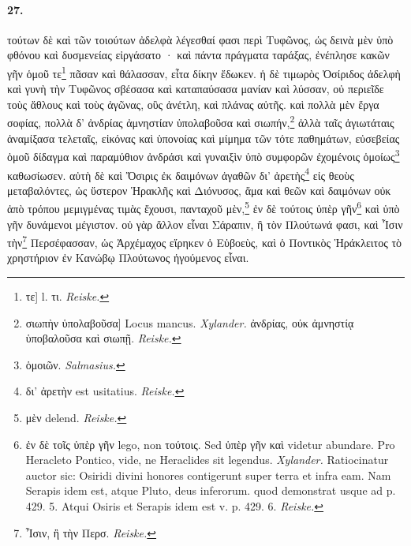 \documentclass[a4paper, 11pt, oneside, polutonikogreek, german]{article}
\begin{document}
\paragraph{27.}
τούτων δὲ καὶ τῶν τοιούτων ἀδελφὰ λέγεσθαί φασι περὶ Τυφῶνος, ὡς δεινὰ μὲν ὑπὸ φθόνου καὶ δυσμενείας εἰργάσατο · καὶ πάντα πράγματα ταράξας, ἐνέπλησε κακῶν γῆν ὁμοῦ τε\footnote{τε] l. τι. \emph{Reiske.}} πᾶσαν καὶ θάλασσαν, εἶτα δίκην ἔδωκεν. ἡ δὲ τιμωρὸς Ὀσίριδος ἀδελφὴ καὶ γυνὴ τὴν Τυφῶνος σβέσασα καὶ καταπαύσασα μανίαν καὶ λύσσαν, οὐ περιεῖδε τοὺς ἄθλους καὶ τοὺς ἀγῶνας, οὓς ἀνέτλη, καὶ πλάνας αὑτῆς. καὶ πολλὰ μὲν ἔργα σοφίας, πολλὰ δ' ἀνδρίας ἀμνηστίαν ὑπολαβοῦσα καὶ σιωπήν,\footnote{σιωπὴν ὑπολαβοῦσα] Locus mancus. \emph{Xylander.} ἀνδρίας, οὐκ ἀμνηστίᾳ ὑποβαλοῦσα καὶ σιωπῇ. \emph{Reiske.}} ἀλλὰ ταῖς ἁγιωτάταις ἀναμίξασα τελεταῖς, εἰκόνας καὶ ὑπονοίας καὶ μίμημα τῶν τότε παθημάτων, εὐσεβείας ὁμοῦ δίδαγμα καὶ παραμύθιον ἀνδράσι καὶ γυναιξὶν ὑπὸ συμφορῶν ἐχομένοις ὁμοίως\footnote{ὁμοιῶν. \emph{Salmasius.}} καθωσίωσεν. αὐτὴ δὲ καὶ Ὄσιρις ἐκ δαιμόνων ἀγαθῶν δι' ἀρετὴς\footnote{δι' ἀρετὴν est usitatius. \emph{Reiske.}} εἰς θεοὺς μεταβαλόντες, ὡς ὕστερον Ἡρακλῆς καὶ Διόνυσος, ἅμα καὶ θεῶν καὶ δαιμόνων οὐκ ἀπὸ τρόπου μεμιγμένας τιμὰς ἔχουσι, πανταχοῦ μὲν,\footnote{μὲν delend. \emph{Reiske.}} ἐν δὲ τούτοις ὑπὲρ γῆν\footnote{ἐν δὲ τοῖς ὑπὲρ γῆν lego, non τούτοις. Sed ὑπὲρ γῆν καὶ videtur abundare. Pro Heracleto Pontico, vide, ne Heraclides sit legendus. \emph{Xylander.} Ratiocinatur auctor sic: Osiridi divini honores contigerunt super terra et infra eam. Nam Serapis idem est, atque Pluto, deus inferorum. quod demonstrat usque ad p. 429. 5. Atqui Osiris et Serapis idem est v. p. 429. 6. \emph{Reiske.}} καὶ ὑπὸ γῆν δυνάμενοι μέγιστον. οὐ γὰρ ἄλλον εἶναι Σάραπιν, ἢ τὸν Πλούτωνά φασι, καὶ Ἶσιν τὴν\footnote{Ἶσιν, ἢ τὴν Περσ. \emph{Reiske.}} Περσέφασσαν, ὡς Ἀρχέμαχος εἴρηκεν ὁ Εὐβοεὺς, καὶ ὁ Ποντικὸς Ἡράκλειτος τὸ χρηστήριον ἐν Κανώβῳ Πλούτωνος ἡγούμενος εἶναι.
\end{document}
